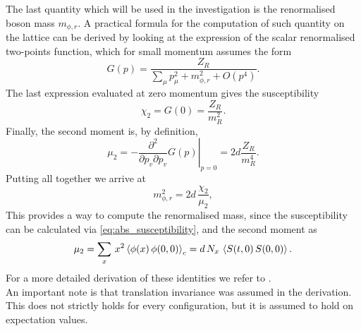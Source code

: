 The last quantity which will be used in the investigation is the renormalised boson mass $m_{\phi,r}$. A practical formula for the computation of such quantity on the lattice can be derived by looking at the expression of the scalar renormalised two-points function, which for small momentum assumes the form
\begin{equation*}
    G(p)=\frac{Z_R}{\sum_\mu p_\mu^2+m_{\phi, r}^2+O\left(p^4\right)}.
\end{equation*}
The last expression evaluated at zero momentum gives the susceptibility 
\begin{equation*}
    \chi_2=G(0)=\frac{Z_R}{m_R^2}.
\end{equation*}
Finally, the second moment is, by definition,
\begin{equation*}
    \mu_2=-\left.\frac{\partial^2}{\partial p_v \partial p_v} G(p)\right|_{p=0}=2 d \frac{Z_R}{m_R^4}.
\end{equation*}
Putting all together we arrive at
\begin{equation*}
    m_{\phi, r}^2 = 2d \, \frac{\chi_2}{\mu_2},
\end{equation*}
This provides a way to compute the renormalised mass, since the susceptibility can be calculated via \eqref{eq:abs_susceptibility}, and the second moment as 
\begin{equation*}
    \mu_2 = \sum_x \, x^2 \left\langle \phi(x) \, \phi(0,0) \right\rangle_c = d \, N_x \, \left\langle S(t,0) \, S(0,0) \right\rangle. 
\end{equation*}
For a more detailed derivation of these identities we refer to \cite{Pawlowski2017CoolingNoise}. \\
An important note is that translation invariance was assumed in the derivation. This does not strictly holds for every configuration, but it is assumed to hold on expectation values.